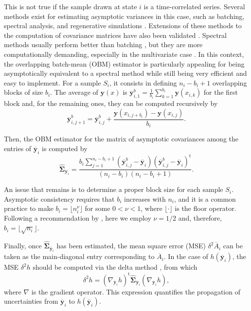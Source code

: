 \documentclass[journal=jctcce,manuscript=article]{achemso}
\newcommand{\mt}[1]{\boldsymbol{\mathbf{#1}}}   %
\newcommand{\vt}[1]{\boldsymbol{\mathbf{#1}}}   %
\newcommand{\tr}[1]{#1^\text{t}}                %
\newcommand{\avg}[1]{\overline{#1}}             %
\begin{document}
This is not true if the sample drawn at state $i$ is a time-correlated series. Several methods exist for estimating asymptotic variances in this case, such as batching, spectral analysis, and regenerative simulations \cite{Geyer_1992, Alexopoulos_2006, Flegal_2010, Doss_2014}. Extensions of these methods to the computation of covariance matrices have also been validated \cite{Vats_2015, Vats_2018}. Spectral methods usually perform better than batching \cite{Flegal_2010}, but they are more computationally demanding, especially in the multivariate case \cite{Vats_2015}. In this context, the overlapping batch-mean (OBM) estimator \cite{Meketon_1984} is particularly appealing for being asymptotically equivalent to a spectral method while still being very efficient and easy to implement. For a sample $S_i$, it consists in defining $n_i-b_i+1$ overlapping blocks of size $b_i$. The average of $\vt y(x)$ is ${\avg{\vt y}}^b_{i,1} = \frac{1}{b_i} \sum_{k=1}^{b_i} \vt y(x_{i,k})$ for the first block and, for the remaining ones, they can be computed recursively by
\begin{equation*}
{\avg{\vt y}}^b_{i,j+1} = {\avg{\vt y}}^b_{i,j} + \frac{\vt y(x_{i,j+b_i}) - \vt y(x_{i,j})}{b_i}.
\end{equation*}

Then, the OBM estimator for the matrix of asymptotic covariances among the entries of $\avg{\vt y}_i$ is computed by \cite{Meketon_1984}
\begin{equation}
\label{eq:obm asymptotic covariance}
\hat{\mt \Sigma}_{\avg{\vt y}_i} = \frac{b_i \sum\limits_{j=1}^{n_i - b_i + 1} ({\avg{\vt y}}^b_{i,j} - \avg{\vt y}_i) \tr{({\avg{\vt y}}^b_{i,j} - \avg{\vt y}_i)}}{(n_i - b_i)(n_i - b_i + 1)}.
\end{equation}

An issue that remains is to determine a proper block size for each sample $S_i$. Asymptotic consistency requires that $b_i$ increases with $n_i$, and it is a common practice to make $b_i = \lfloor n_i^\nu \rfloor$ for some $0 < \nu < 1$, where $\lfloor \cdot \rfloor$ is the floor operator. Following a recommendation by \citeauthor{Flegal_2010} \cite{Flegal_2010}, here we employ $\nu = 1/2$ and, therefore, $b_i = \lfloor \sqrt{n_i} \rfloor$.

Finally, once $\hat{\mt \Sigma}_{\avg{\vt y}_i}$ has been estimated, the mean square error (MSE) $\delta^2 \avg A_i$ can be taken as the main-diagonal entry corresponding to $\avg A_i$. In the case of $h(\avg{\vt y}_i)$, the MSE $\delta^2 h$ should be computed via the delta method \cite{Greene_2012}, from which
\begin{equation}
\label{eq:delta method}
\delta^2 h = \tr{(\nabla_{\avg{\vt y}_i} h)} \hat{\mt \Sigma}_{\avg{\vt y}_i}(\nabla_{\avg{\vt y}_i} h),
\end{equation}
where $\nabla$ is the gradient operator. This expression quantifies the propagation of uncertainties from $\avg{\vt y}_i$ to $h(\avg{\vt y}_i)$.
\end{document}
